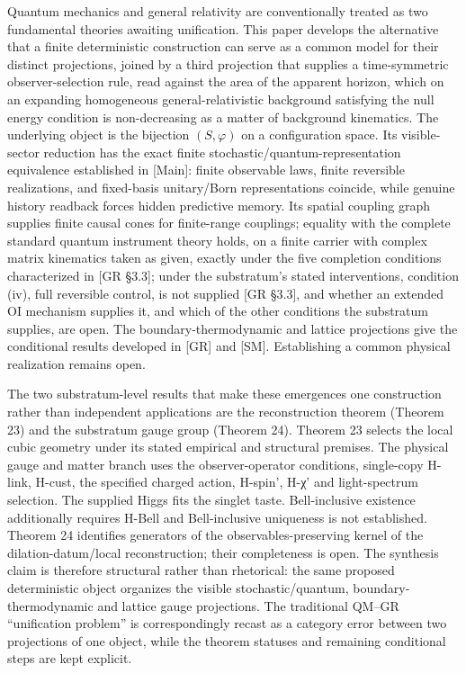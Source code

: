 \documentclass[
]{article}
\begin{document}
Quantum mechanics and general relativity are conventionally treated as
two fundamental theories awaiting unification. This paper develops the
alternative that a finite deterministic construction can serve as a
common model for their distinct projections, joined by a third
projection that supplies a time-symmetric observer-selection rule, read
against the area of the apparent horizon, which on an expanding
homogeneous general-relativistic background satisfying the null energy
condition is non-decreasing as a matter of background kinematics. The
underlying object is the bijection \((S,\varphi)\) on a configuration
space. Its visible-sector reduction has the exact finite
stochastic/quantum-representation equivalence established in {[}Main{]}:
finite observable laws, finite reversible realizations, and fixed-basis
unitary/Born representations coincide, while genuine history readback
forces hidden predictive memory. Its spatial coupling graph supplies
finite causal cones for finite-range couplings; equality with the
complete standard quantum instrument theory holds, on a finite carrier
with complex matrix kinematics taken as given, exactly under the five
completion conditions characterized in {[}GR §3.3{]}; under the
substratum's stated interventions, condition (iv), full reversible
control, is not supplied {[}GR §3.3{]}, and whether an extended OI
mechanism supplies it, and which of the other conditions the substratum
supplies, are open. The boundary-thermodynamic and lattice projections
give the conditional results developed in {[}GR{]} and {[}SM{]}.
Establishing a common physical realization remains open.

The two substratum-level results that make these emergences one
construction rather than independent applications are the reconstruction
theorem (Theorem 23) and the substratum gauge group (Theorem 24).
Theorem 23 selects the local cubic geometry under its stated empirical
and structural premises. The physical gauge and matter branch uses the
observer-operator conditions, single-copy H-link, H-cust, the specified
charged action, H-spin', H-χ' and light-spectrum selection. The supplied
Higgs fits the singlet taste. Bell-inclusive existence additionally
requires H-Bell and Bell-inclusive uniqueness is not established.
Theorem 24 identifies generators of the observables-preserving kernel of
the dilation-datum/local reconstruction; their completeness is open. The
synthesis claim is therefore structural rather than rhetorical: the same
proposed deterministic object organizes the visible stochastic/quantum,
boundary-thermodynamic and lattice gauge projections. The traditional
QM--GR ``unification problem'' is correspondingly recast as a category
error between two projections of one object, while the theorem statuses
and remaining conditional steps are kept explicit.
\end{document}
